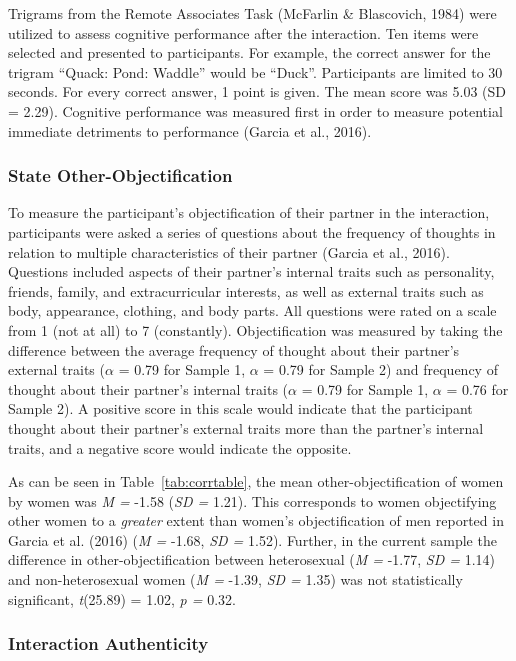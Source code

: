 \documentclass[man]{apa6}
\begin{document}
Trigrams from the Remote Associates Task (McFarlin \& Blascovich, 1984)
were utilized to assess cognitive performance after the interaction. Ten
items were selected and presented to participants. For example, the
correct answer for the trigram \enquote{Quack: Pond: Waddle} would be
\enquote{Duck}. Participants are limited to 30 seconds. For every
correct answer, 1 point is given. The mean score was 5.03 (SD = 2.29).
Cognitive performance was measured first in order to measure potential
immediate detriments to performance (Garcia et al., 2016).

\subsubsection{State
Other-Objectification}\label{state-other-objectification}

To measure the participant's objectification of their partner in the
interaction, participants were asked a series of questions about the
frequency of thoughts in relation to multiple characteristics of their
partner (Garcia et al., 2016). Questions included aspects of their
partner's internal traits such as personality, friends, family, and
extracurricular interests, as well as external traits such as body,
appearance, clothing, and body parts. All questions were rated on a
scale from 1 (not at all) to 7 (constantly). Objectification was
measured by taking the difference between the average frequency of
thought about their partner's external traits (\(\alpha\) = 0.79 for
Sample 1, \(\alpha\) = 0.79 for Sample 2) and frequency of thought about
their partner's internal traits (\(\alpha\) = 0.79 for Sample 1,
\(\alpha\) = 0.76 for Sample 2). A positive score in this scale would
indicate that the participant thought about their partner's external
traits more than the partner's internal traits, and a negative score
would indicate the opposite.

As can be seen in Table~\ref{tab:corrtable}, the mean
other-objectification of women by women was \emph{M =} -1.58 (\emph{SD
=} 1.21). This corresponds to women objectifying other women to a
\emph{greater} extent than women's objectification of men reported in
Garcia et al. (2016) (\emph{M =} -1.68, \emph{SD =} 1.52). Further, in
the current sample the difference in other-objectification between
heterosexual (\emph{M =} -1.77, \emph{SD =} 1.14) and non-heterosexual
women (\emph{M =} -1.39, \emph{SD =} 1.35) was not statistically
significant, \emph{t}(25.89) = 1.02, \emph{p =} 0.32.

\subsubsection{Interaction Authenticity}\label{interaction-authenticity}
\end{document}
